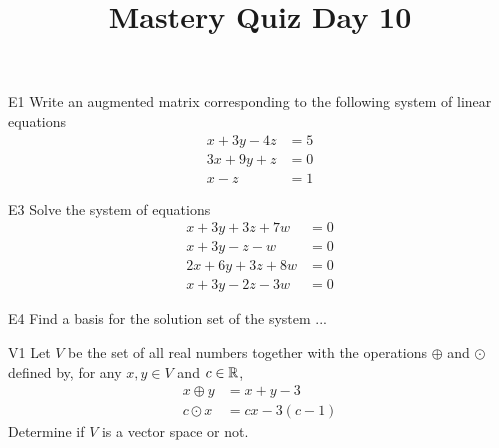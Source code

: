 \documentclass{sbgLAquiz}
\title{Mastery Quiz Day 10 }
\begin{document}
\begin{problem}{E1}
Write an augmented matrix corresponding to the following system of linear equations
\begin{align*}
x+3y-4z &= 5 \\
3x+9y+z &= 0 \\
x-z &= 1
\end{align*}
\end{problem}

\begin{problem}{E3}
Solve the system of equations
\begin{align*}
x+3y+3z+7w &= 0 \\
 x+3y-z-w &= 0 \\
  2x+6y+3z+8w &= 0 \\
   x+3y-2z-3w &= 0
\end{align*}
\end{problem}
\newpage

\begin{problem}{E4}
Find a basis for the solution set of the system ...
\end{problem}

\begin{problem}{V1}
Let $V$ be the  set of all real numbers together with the operations $\oplus$ and $\odot$ defined by, for any $x,y \in V$ and $c \in \mathbb{R}$,
\begin{align*}
x\oplus y  &= x+y-3 \\
c \odot x &= cx-3(c-1)
\end{align*}
Determine if $V$ is a vector space or not.
\end{problem}
\end{document}
